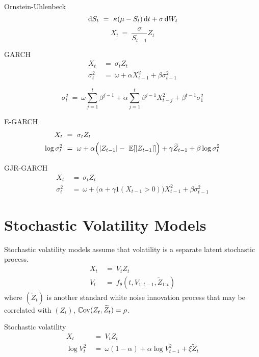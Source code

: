 Ornstein-Uhlenbeck
\begin{equation*}
\, \textrm{d} S_t ~ = ~ \kappa(\mu-S_t) \, \textrm{d} t + \sigma \, \textrm{d} W_t
\end{equation*}
\begin{equation*}
X_t ~ = ~ \frac{\sigma}{S_{t-1}} Z_t
\end{equation*}

GARCH
\begin{align*}
X_t ~ &= ~ \sigma_t Z_t \\
\sigma_t^2 ~ &= ~ \omega + \alpha X_{t-1}^2 + \beta \sigma_{t-1}^2
\end{align*}

\begin{equation*}
\sigma_t^2 ~ = ~ \omega \sum_{j=1}^t \beta^{j-1} + \alpha \sum_{j=1}^t \beta^{j-1} X_{t-j}^2 + \beta^{t-1} \sigma_1^2
\end{equation*}

E-GARCH
\begin{align*}
X_t ~ &= ~ \sigma_t Z_t \\
\log \sigma_t^2 ~ &= ~ \omega + \alpha \Big( |Z_{t-1}| - \E[|Z_{t-1}|] \Big) + \gamma \widetilde{Z}_{t-1} + \beta \log \sigma_t^2
\end{align*}

GJR-GARCH
\begin{align*}
X_t ~ &= ~ \sigma_t Z_t \\
\sigma_t^2 ~ &= ~ \omega + \Big( \alpha + \gamma 1(X_{t-1} > 0) \Big) X_{t-1}^2 + \beta \sigma_{t-1}^2
\end{align*}



\section{Stochastic Volatility Models}

Stochastic volatility models assume that volatility is a separate latent stochastic process.
\begin{align*}
X_t ~ &= ~ V_t Z_t \\
V_t ~ &= ~ f_\theta(t, V_{1:t-1}, \widetilde{Z}_{1:t})
\end{align*}
where $(\widetilde{Z}_t)$ is another standard white noise innovation process that may be correlated with $(Z_t)$, $\operatorname{\mathbb{C}ov}(Z_t, \widetilde{Z}_t) = \rho$.

Stochastic volatility
\begin{align*}
X_t ~ &= ~ V_t Z_t \\
\log V_t^2 ~ &= ~ \omega(1-\alpha)  + \alpha \log V_{t-1}^2 + \xi \widetilde{Z}_t
\end{align*}

